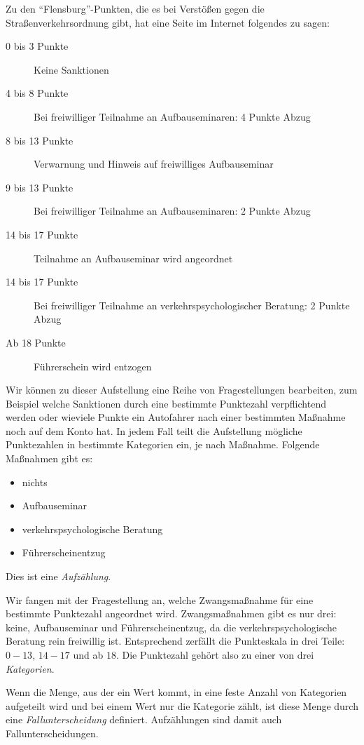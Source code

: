 Zu den "`Flensburg"'-Punkten, die es bei Verstößen gegen die
Straßenverkehrsordnung gibt, hat eine Seite im Internet folgendes zu
sagen:
%
\begin{description}
\item[0 bis 3 Punkte] Keine Sanktionen
\item[4 bis 8 Punkte] Bei freiwilliger Teilnahme an Aufbauseminaren: 4 Punkte Abzug
\item[8 bis 13 Punkte] Verwarnung und Hinweis auf freiwilliges Aufbauseminar
\item[9 bis 13 Punkte] Bei freiwilliger Teilnahme an Aufbauseminaren: 2 Punkte Abzug
\item[14 bis 17 Punkte] Teilnahme an Aufbauseminar wird angeordnet
\item[14 bis 17 Punkte]
Bei freiwilliger Teilnahme an verkehrspsychologischer Beratung: 2 Punkte Abzug
\item[Ab 18 Punkte]
Führerschein wird entzogen
\end{description}
%
Wir können zu dieser Aufstellung eine Reihe von Fragestellungen
bearbeiten, zum Beispiel welche Sanktionen durch eine bestimmte
Punktezahl verpflichtend werden oder wieviele Punkte ein Autofahrer
nach einer bestimmten Maßnahme noch auf dem Konto hat.  In jedem Fall
teilt die Aufstellung mögliche Punktezahlen in bestimmte Kategorien
ein, je nach Maßnahme.  Folgende Maßnahmen gibt es:
%
\begin{itemize}
\item nichts
\item Aufbauseminar
\item verkehrspsychologische Beratung
\item Führerscheinentzug
\end{itemize}
%
Dies ist eine \textit{Aufzählung}.

Wir fangen mit der Fragestellung an, welche Zwangsmaßnahme für eine
bestimmte Punktezahl angeordnet wird.  Zwangsmaßnahmen gibt es nur
drei: keine, Aufbauseminar und Führerscheinentzug, da die
verkehrspsychologische Beratung rein freiwillig ist.  Entsprechend
zerfällt die Punkteskala in drei Teile: $0-13$, $14-17$ und ab $18$.
Die Punktezahl gehört also zu einer von drei
\textit{Kategorien}.

Wenn die Menge, aus der ein Wert kommt, in eine feste
Anzahl von Kategorien aufgeteilt wird und bei einem Wert nur die
Kategorie zählt, ist diese Menge durch eine \textit{Fallunterscheidung} definiert.
Aufzählungen sind damit auch Fallunterscheidungen.

